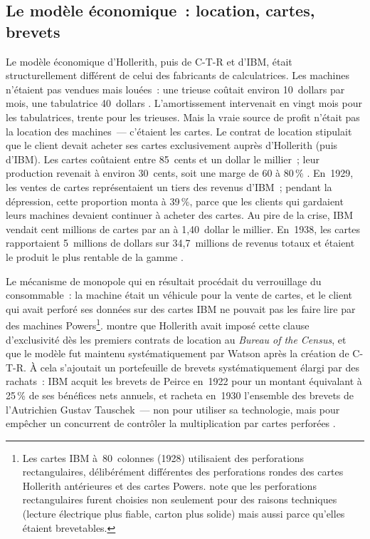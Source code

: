 \subsection{Le modèle économique~: location, cartes, brevets}\label{subsec:ibm_model}

%
Le modèle économique d'Hollerith, puis de C-T-R et d'IBM, était structurellement différent de celui des fabricants de calculatrices. Les machines n'étaient pas vendues mais louées~: une trieuse coûtait environ 10~dollars par mois, une tabulatrice 40~dollars \parencite{cortada_before_1993}. L'amortissement intervenait en vingt mois pour les tabulatrices, trente pour les trieuses. Mais la vraie source de profit n'était pas la location des machines~--- c'étaient les cartes. Le contrat de location stipulait que le client devait acheter ses cartes exclusivement auprès d'Hollerith (puis d'IBM). Les cartes coûtaient entre 85~cents et un dollar le millier~; leur production revenait à environ 30~cents, soit une marge de 60 à 80\,\% \parencite{cortada_before_1993}. En~1929, les ventes de cartes représentaient un tiers des revenus d'IBM~; pendant la dépression, cette proportion monta à 39\,\%, parce que les clients qui gardaient leurs machines devaient continuer à acheter des cartes. Au pire de la crise, IBM vendait cent millions de cartes par an à 1,40~dollar le millier. En~1938, les cartes rapportaient 5~millions de dollars sur 34,7~millions de revenus totaux et étaient le produit le plus rentable de la gamme \parencite{cortada_before_1993}.

Le mécanisme de monopole qui en résultait procédait du verrouillage du consommable~: la machine était un véhicule pour la vente de cartes, et le client qui avait perforé ses données sur des cartes IBM ne pouvait pas les faire lire par des machines Powers\footnote{Les cartes IBM à~80~colonnes (1928) utilisaient des perforations rectangulaires, délibérément différentes des perforations rondes des cartes Hollerith antérieures et des cartes Powers. \textcite{heide_punched_2009} note que les perforations rectangulaires furent choisies non seulement pour des raisons techniques (lecture électrique plus fiable, carton plus solide) mais aussi parce qu'elles étaient brevetables.}. \textcite{austrian_hollerith_1982} montre que Hollerith avait imposé cette clause d'exclusivité dès les premiers contrats de location au \emph{Bureau of the Census}, et que le modèle fut maintenu systématiquement par Watson après la création de C-T-R. À cela s'ajoutait un portefeuille de brevets systématiquement élargi par des rachats~: IBM acquit les brevets de Peirce en~1922 pour un montant équivalant à 25\,\% de ses bénéfices nets annuels, et racheta en~1930 l'ensemble des brevets de l'Autrichien Gustav Tauschek~--- non pour utiliser sa technologie, mais pour empêcher un concurrent de contrôler la multiplication par cartes perforées \parencite{heide_punched_2009}.

